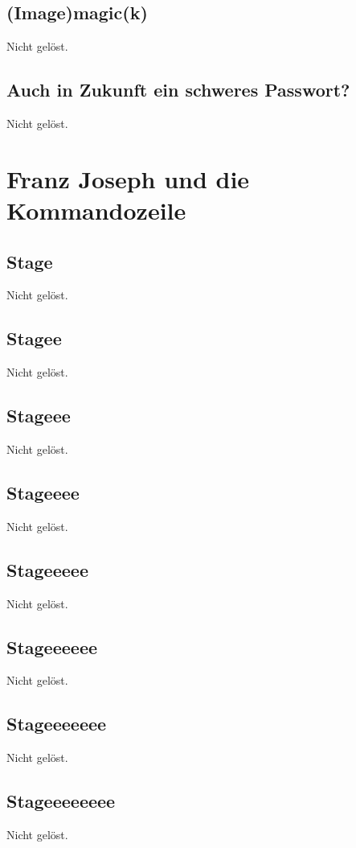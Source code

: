 \documentclass[12pt,a4paper,titlepage,oneside]{scrartcl}
\begin{document}
\subsection{(Image)magic(k)}
Nicht gelöst.

\subsection{Auch in Zukunft ein schweres Passwort?}
Nicht gelöst.


\section{Franz Joseph und die Kommandozeile}

\subsection{Stage}
Nicht gelöst.

\subsection{Stagee}
Nicht gelöst.

\subsection{Stageee}
Nicht gelöst.

\subsection{Stageeee}
Nicht gelöst.

\subsection{Stageeeee}
Nicht gelöst.

\subsection{Stageeeeee}
Nicht gelöst.

\subsection{Stageeeeeee}
Nicht gelöst.

\subsection{Stageeeeeeee}
Nicht gelöst.
\end{document}
